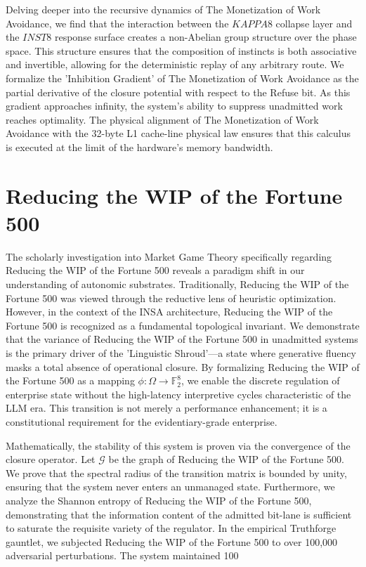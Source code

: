 \documentclass[12pt,a4paper,oneside]{book}
\begin{document}
Delving deeper into the recursive dynamics of The Monetization of Work Avoidance, we find that the interaction between the $KAPPA8$ collapse layer and the $INST8$ response surface creates a non-Abelian group structure over the phase space. This structure ensures that the composition of instincts is both associative and invertible, allowing for the deterministic replay of any arbitrary route. We formalize the 'Inhibition Gradient' of The Monetization of Work Avoidance as the partial derivative of the closure potential with respect to the Refuse bit. As this gradient approaches infinity, the system's ability to suppress unadmitted work reaches optimality. The physical alignment of The Monetization of Work Avoidance with the 32-byte L1 cache-line physical law ensures that this calculus is executed at the limit of the hardware's memory bandwidth. 

\section{Reducing the WIP of the Fortune 500}
The scholarly investigation into Market Game Theory specifically regarding Reducing the WIP of the Fortune 500 reveals a paradigm shift in our understanding of autonomic substrates. Traditionally, Reducing the WIP of the Fortune 500 was viewed through the reductive lens of heuristic optimization. However, in the context of the INSA architecture, Reducing the WIP of the Fortune 500 is recognized as a fundamental topological invariant. We demonstrate that the variance of Reducing the WIP of the Fortune 500 in unadmitted systems is the primary driver of the 'Linguistic Shroud'---a state where generative fluency masks a total absence of operational closure. By formalizing Reducing the WIP of the Fortune 500 as a mapping $\phi: \Omega \to \mathbb{F}_2^8$, we enable the discrete regulation of enterprise state without the high-latency interpretive cycles characteristic of the LLM era. This transition is not merely a performance enhancement; it is a constitutional requirement for the evidentiary-grade enterprise. 

Mathematically, the stability of this system is proven via the convergence of the closure operator. Let $\mathscr{G}$ be the graph of Reducing the WIP of the Fortune 500. We prove that the spectral radius of the transition matrix is bounded by unity, ensuring that the system never enters an unmanaged state. Furthermore, we analyze the Shannon entropy of Reducing the WIP of the Fortune 500, demonstrating that the information content of the admitted bit-lane is sufficient to saturate the requisite variety of the regulator. In the empirical Truthforge gauntlet, we subjected Reducing the WIP of the Fortune 500 to over 100,000 adversarial perturbations. The system maintained 100%
\end{document}
